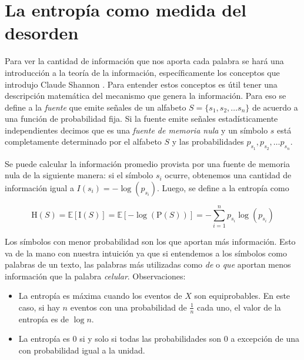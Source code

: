 \section{La entropía como medida del desorden}
\label{sub:entropiaShannon}

Para ver la cantidad de información que nos aporta cada palabra se hará una introducción a la teoría de la información, específicamente
los conceptos que introdujo Claude Shannon \cite{shannon2001mathematical,abramson1963information}.
Para entender estos conceptos es útil tener una descripción matemática del mecanismo que genera la información. Para eso se define a 
la \textit{fuente} que emite señales de un alfabeto $ S = \{s_1, s_2, \dotsc s_n\}$ de acuerdo a una función de probabilidad fija.
Si la fuente emite señales estadísticamente independientes decimos que es una \textit{fuente de memoria nula} y un símbolo $s$ está completamente determinado por el alfabeto $S$ y las probabilidades $p_{s_1}, p_{s_2}, \dotsc p_{s_n}$.



Se puede calcular la información promedio provista por una fuente de memoria nula de la siguiente manera: si el símbolo $s_i$ ocurre, obtenemos una cantidad de información igual a $I(s_i) = -\log(p_{s_i})$.
Luego, se define a la entropía como 

\begin{equation}
    {\displaystyle \mathrm {H} (S)=\mathbb{E} [\mathrm {I} (S)]=\mathbb{E} [-\log(\mathrm {P} (S))]} = -\sum\limits_{i=1}^{n} p_{s_i} \log(p_{s_i})
\end{equation}



Los símbolos con menor probabilidad son los que aportan más información. Esto va de la mano con nuestra intuición ya que si entendemos a los símbolos como palabras de un texto, las palabras más utilizadas como \textit{de} o \textit{que} aportan menos información que la palabra \textit{celular}. 
Observaciones:
\begin{itemize}
    \item La entropía es máxima cuando los eventos de $X$ son equiprobables. En este caso, si hay $n$ eventos con una probabilidad de $\frac{1}{n}$ cada uno, el valor de la entropía es de $\log n$.
    \item La entropía es 0 si y solo si todas las probabilidades son 0 a excepción de una con probabilidad igual a la unidad. 
\end{itemize}

